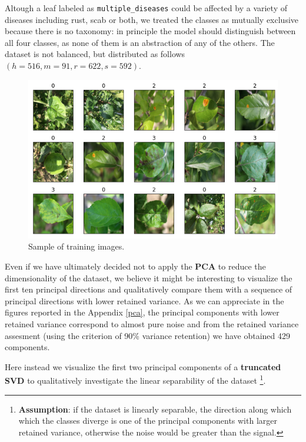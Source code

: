 \documentclass[aps,twocolumn,secnumarabic,nobalancelastpage,amsmath,amssymb,
nofootinbib]{revtex4}
\begin{document}
Altough a leaf labeled as \texttt{multiple\_diseases} could be affected
by a variety of diseases including rust, scab or both, we treated the
classes as mutually exclusive because there is no taxonomy: in principle
the model should distinguish between all four classes, as none of them
is an abstraction of any of the others. The dataset is not balanced, but
distributed as follows \((h = 516, m = 91, r = 622, s = 592)\).

\begin{figure}[h]
	\centering
	\includegraphics[width=0.9\linewidth]{Images/InputImages}
	\caption{Sample of training images.}
	\label{fig:inputimages}
\end{figure}


Even if we have ultimately decided not to apply the \textbf{PCA} to
reduce the dimensionality of the dataset, we believe it might be
interesting to visualize the first ten principal directions and
qualitatively compare them with a sequence of principal directions with
lower retained variance. As we can appreciate in the figures reported in
the Appendix \ref{pca}, the principal components with
lower retained variance correspond to almost pure noise and from the
retained variance assesment (using the criterion of 90\% variance
retention) we have obtained 429 components.

Here instead we visualize the first two principal components of a
\textbf{truncated SVD} to qualitatively investigate the linear
separability of the dataset \footnote{\textbf{Assumption}: if the
	dataset is linearly separable, the direction along which which the
	classes diverge is one of the principal components with larger
	retained variance, otherwise the noise would be greater than the
	signal.}.
\end{document}
